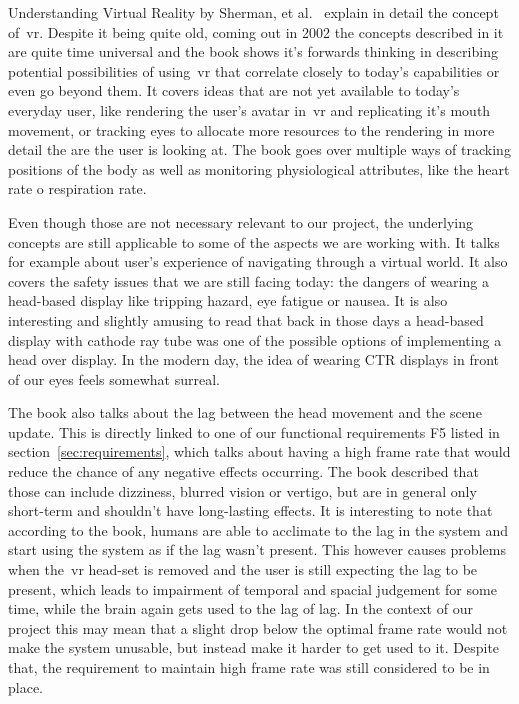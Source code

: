 Understanding Virtual Reality by Sherman, et al.~\cite{sherman2003} explain in detail the concept of~\acrfull{vr}. Despite it being quite old, coming out in 2002 the concepts described in it are quite time universal and the book shows it's forwards thinking in describing potential possibilities of using~\acrshort{vr} that correlate closely to today's capabilities or even go beyond them. It covers ideas that are not yet available to today's everyday user, like rendering the user's avatar in~\acrshort{vr} and replicating it's mouth movement, or tracking eyes to allocate more resources to the rendering in more detail the are the user is looking at. The book goes over multiple ways of tracking positions of the body as well as monitoring physiological attributes, like the heart rate o respiration rate.

Even though those are not necessary relevant to our project, the underlying concepts are still applicable to some of the aspects we are working with. It talks for example about user's experience of navigating through a virtual world. It also covers the safety issues that we are still facing today: the dangers of wearing a head-based display like tripping hazard, eye fatigue or nausea. It is also interesting and slightly amusing to read that back in those days a head-based display with cathode ray tube was one of the possible options of implementing a head over display. In the modern day, the idea of wearing CTR displays in front of our eyes feels somewhat surreal.

The book also talks about the lag between the head movement and the scene update. This is directly linked to one of our functional requirements F5 listed in section~\ref{sec:requirements}, which talks about having a high frame rate that would reduce the chance of any negative effects occurring. The book described that those can include dizziness, blurred vision or vertigo, but are in general only short-term and shouldn't have long-lasting effects. It is interesting to note that according to the book, humans are able to acclimate to the lag in the system and start using the system as if the lag wasn't present. This however causes problems when the~\acrshort{vr} head-set is removed and the user is still expecting the lag to be present, which leads to impairment of temporal and spacial judgement for some time, while the brain again gets used to the lag of lag. In the context of our project this may mean that a slight drop below the optimal frame rate would not make the system unusable, but instead make it harder to get used to it. Despite that, the requirement to maintain high frame rate was still considered to be in place.


